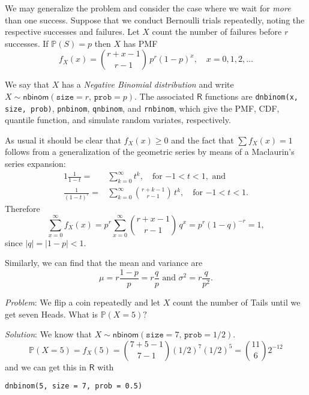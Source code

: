 We may generalize the problem and consider the case where we wait for
\emph{more} than one success. Suppose that we conduct Bernoulli trials
repeatedly, noting the respective successes and failures. Let \(X\)
count the number of failures before \(r\) successes. If
\(\mathbb{P}(S)=p\) then \(X\) has PMF
\begin{equation}
f_{X}(x)={r+x-1 \choose r-1}\, p^{r}(1-p)^{x},\quad x=0,1,2,\ldots
\end{equation}

We say that \(X\) has a \emph{Negative Binomial distribution} and write
\(X\sim\mathsf{nbinom}(\mathtt{size}=r,\,\mathtt{prob}=p)\). The
associated \(\mathsf{R}\) functions are \texttt{dnbinom(x, size, prob)},
\texttt{pnbinom}, \texttt{qnbinom}, and \texttt{rnbinom}, which give the PMF, CDF, quantile
function, and simulate random variates, respectively.

As usual it should be clear that \(f_{X}(x)\geq 0\) and the fact that
\(\sum f_{X}(x)=1\) follows from a generalization of the geometric
series by means of a Maclaurin's series expansion:
\begin{alignat}{1}
\frac{1}{1-t}= & \sum_{k=0}^{\infty}t^{k},\quad \mbox{for \(-1 < t < 1\)},\mbox{ and}\\
\frac{1}{(1-t)^{r}}= & \sum_{k=0}^{\infty}{r+k-1 \choose r-1}\, t^{k},\quad \mbox{for \(-1 < t < 1\)}.
\end{alignat}
Therefore
\begin{equation}
\sum_{x=0}^{\infty}f_{X}(x)=p^{r}\sum_{x=0}^{\infty}{r+x-1 \choose r-1}\, q^{x}=p^{r}(1-q)^{-r}=1,
\end{equation}
since \(|q|=|1-p|<1\). 

Similarly, we can find that the mean and variance are
\begin{equation}
\mu=r\frac{1-p}{p}=r\frac{q}{p}\mbox{ and }\sigma^{2}=r\frac{q}{p^{2}}.
\end{equation}

\emph{Problem}:
We flip a coin repeatedly and let \(X\) count the number of Tails
until we get seven Heads. What is \(\mathbb{P}(X=5)?\)

\emph{Solution}: We
know that
\(X\sim\mathsf{nbinom}(\mathtt{size}=7,\,\mathtt{prob}=1/2)\).  
\[
\mathbb{P}(X=5)=f_{X}(5)={7+5-1 \choose 7-1}(1/2)^{7}(1/2)^{5}={11
\choose 6}2^{-12} 
\]
and we can get this in \(\mathsf{R}\) with

\begin{Verbatim}
dnbinom(5, size = 7, prob = 0.5)
\end{Verbatim}

